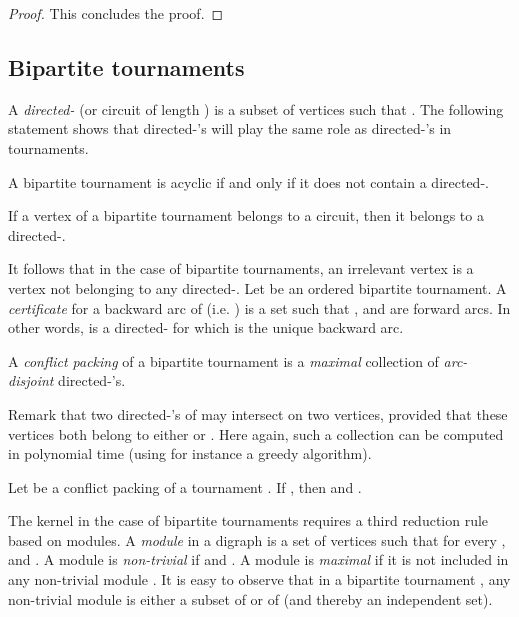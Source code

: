 \begin{proof}
This concludes the proof. 
\end{proof}
 
\subsection{Bipartite tournaments}

A  \emph{directed-} (or circuit of length ) is a subset  of vertices such that . The following statement shows that directed-'s will play the same role as directed-'s in tournaments. 

\begin{lemma}\cite{DGHNT10}
A bipartite tournament is acyclic if and only if it does not contain a directed-.
\end{lemma}

\begin{lemma} \cite{MRRS13}
If a vertex of a bipartite tournament belongs to a circuit, then it belongs to a directed-.
\end{lemma}

It follows that in the case of bipartite tournaments, an irrelevant vertex is a vertex not belonging to any directed-. Let  be an ordered bipartite tournament. A \emph{certificate} for a backward arc  of  (i.e. ) is a set  such that ,  and  are forward arcs. In other words,  is a directed- for which  is the unique backward arc. 

\begin{definition} \label{def:cpfasbt}
A \emph{conflict packing}  of a bipartite tournament is a \emph{maximal} collection of \emph{arc-disjoint} directed-'s.
\end{definition}

Remark that two directed-'s of  may intersect on two vertices, provided that these vertices both belong to  either  or . Here again, such a collection can be computed in polynomial time (using for instance a greedy algorithm). 

\begin{observation} \label{prop:cpfasbt}
Let  be a conflict packing of a tournament . If , then  and .
\end{observation}


The kernel in the case of bipartite tournaments requires a third reduction rule based on modules. A \emph{module} in a digraph  is a set of vertices  such that for every ,  and . A module  is \emph{non-trivial} if  and . A module  is \emph{maximal} if it is not included in any non-trivial module . It is easy to observe that in a bipartite tournament , any non-trivial module  is either a subset of  or of  (and thereby an independent set). 

